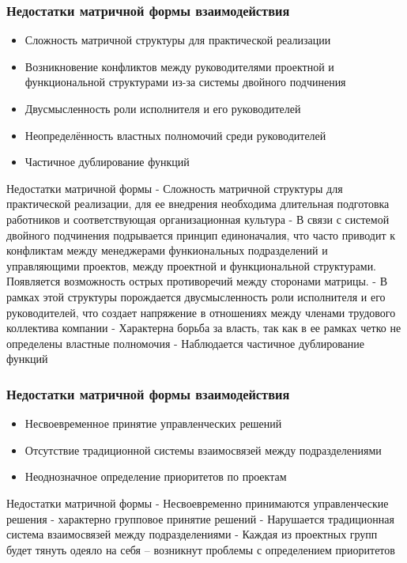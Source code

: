 \documentclass{../industrial-development}
\begin{document}
\begin{frame} \frametitle{Недостатки матричной формы взаимодействия}
  
  \begin{itemize}
  \item Сложность матричной структуры для практической реализации
  \item Возникновение конфликтов между руководителями проектной и функциональной структурами из-за системы двойного подчинения
  \item Двусмысленность роли исполнителя и его руководителей
  \item Неопределённость властных полномочий среди руководителей
  \item Частичное дублирование функций
\end{itemize}
\end{frame}

\lecturenotes
Недостатки матричной формы
- Сложность матричной структуры для практической реализации, для ее внедрения необходима длительная подготовка работников и соответствующая организационная культура
- В связи с системой двойного подчинения подрывается принцип единоначалия, что часто приводит к конфликтам между менеджерами функиональных подразделений и управляющими проектов, между проектной и функциональной структурами. Появляется возможность острых противоречий между сторонами матрицы.
- В рамках этой структуры порождается двусмысленность роли исполнителя и его руководителей, что создает напряжение в отношениях между членами трудового коллектива компании
- Характерна борьба за власть, так как в ее рамках четко не определены властные полномочия
- Наблюдается частичное дублирование функций

\begin{frame} \frametitle{Недостатки матричной формы взаимодействия}
\begin{itemize}
  \item Несвоевременное принятие управленческих решений
  \item Отсутствие традиционной системы взаимосвязей между подразделениями
  \item Неоднозначное определение приоритетов по проектам
  \end{itemize}
\end{frame}

\lecturenotes
Недостатки матричной формы
- Несвоевременно принимаются управленческие решения - характерно групповое принятие решений
- Нарушается традиционная система взаимосвязей между подразделениями
- Каждая из проектных групп будет тянуть одеяло на себя – возникнут проблемы  с определением приоритетов
\end{document}
